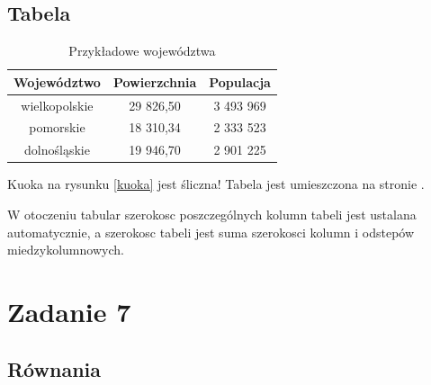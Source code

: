 \documentclass{article}
\begin{document}
\subsection{Tabela}
\vspace{0,3cm}

\begin{table}[h]
	
	\centering
	\caption{Przykładowe województwa}
	\vspace{0,2cm}
	\label{tabela}
	
	\begin{tabular}{ | c | c | c |}
		\hline
		\textbf{Województwo} & \textbf{Powierzchnia} & \textbf{Populacja} \\ [0.5ex] 
		\hline\hline
		wielkopolskie & 29 826,50 & 3 493 969 \\ 
		\hline
		pomorskie & 18 310,34 & 2 333 523	 \\  
		\hline
		dolnośląskie & 19 946,70 & 2 901 225 \\
		\hline 
	\end{tabular}

\end{table}

\begin{center}
	Kuoka na rysunku \ref{kuoka} jest śliczna!
	Tabela jest umieszczona na stronie \pageref{tabela}.
\end{center}

\begin{center}
	W otoczeniu tabular szerokosc poszczególnych kolumn tabeli jest ustalana
	automatycznie, a szerokosc tabeli jest suma szerokosci kolumn i odstepów
	miedzykolumnowych. \cite{lat}
\end{center}



\newpage
\section{Zadanie 7}
\vspace{0,3cm}
\subsection{Równania}
\end{document}
